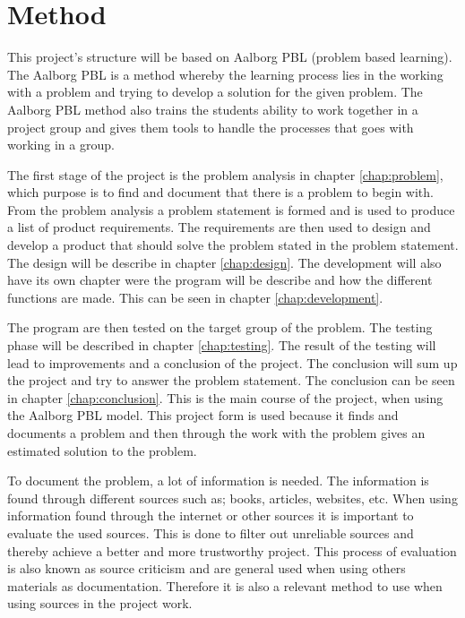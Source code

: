 \section{Method}
This project's structure will be based on Aalborg PBL (problem based learning). The Aalborg PBL is a method whereby the learning process lies in the working with a problem and trying to develop a solution for the given problem.
The Aalborg PBL method also trains the students ability to work together in a project group and gives them tools to handle the processes that goes with working in a group.

The first stage of the project is the problem analysis in chapter \ref{chap:problem}, which purpose is to find and document that there is a problem to begin with. From the problem analysis a problem statement is formed and is used to produce a list of product requirements.
The requirements are then used to design and develop a product that should solve the problem stated in the problem statement. The design will be describe in chapter \ref{chap:design}.
The development will also have its own chapter were the program will be describe and how the different functions are made. This can be seen in chapter \ref{chap:development}.

The program are then tested on the target group of the problem. The testing phase will be described in chapter \ref{chap:testing}. The result of the testing will lead to improvements and a conclusion of the project. The conclusion will sum up the project and try to answer the problem statement. The conclusion can be seen in chapter \ref{chap:conclusion}. This is the main course of the project, when using the Aalborg PBL model.
This project form is used because it finds and documents a problem and then through the work with the problem gives an estimated solution to the problem.

To document the problem, a lot of information is needed. The information is found through different sources such as; books, articles, websites, etc. When using information found through the internet or other sources it is important to evaluate the used sources.
This is done to filter out unreliable sources and thereby achieve a better and more trustworthy project.
This process of evaluation is also known as source criticism and are general used when using others materials as documentation. Therefore it is also a relevant method to use when using sources in the project work.